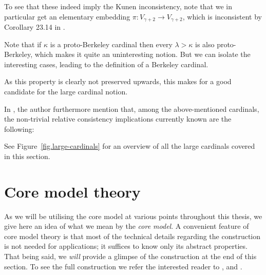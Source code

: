 \documentclass[../../main]{subfiles}
\begin{document}
To see that these indeed imply the Kunen inconsistency, note that we in particular get an elementary embedding $\pi\colon V_{\gamma + 2}\to V_{\gamma + 2}$, which is inconsistent by Corollary 23.14 in \cite{Kanamori}.

\qquad Note that if $\kappa$ is a proto-Berkeley cardinal then every $\lambda>\kappa$ is also proto-Berkeley, which makes it quite an uninteresting notion. But we can isolate the interesting cases, leading to the definition of a Berkeley cardinal. 


As this property is clearly not preserved upwards, this makes for a good candidate for the large cardinal notion.


In \cite{Cutolo}, the author furthermore mention that, among the above-mentioned cardinals, the non-trivial relative consistency implications currently known are the following:



See Figure~\ref{fig.large-cardinals} for an overview of all the large cardinals covered in this section.



\section{Core model theory}
\label{prelims.core-model-theory}

As we will be utilising the core model at various points throughout this thesis, we give here an idea of what we mean by the \textit{core model}. A convenient feature of core model theory is that most of the technical details regarding the construction is not needed for applications; it suffices to know only its abstract properties. That being said, we \textit{will} provide a glimpse of the construction at the end of this section. To see the full construction we refer the interested reader to \cite{MSc}, \cite{Zeman} and \cite{JensenSteel}. 
\end{document}

